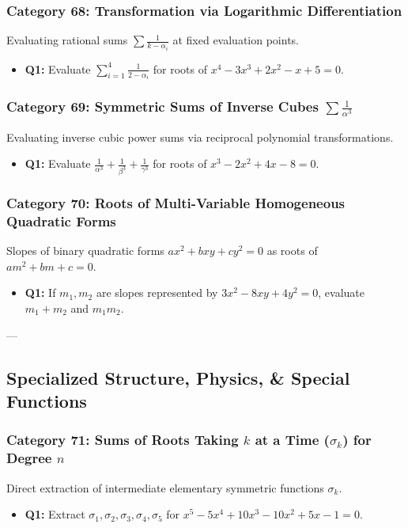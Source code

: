 \documentclass[10pt,a4paper]{article}
\begin{document}
\subsubsection{Category 68: Transformation via Logarithmic Differentiation}
Evaluating rational sums $\sum \frac{1}{k - \alpha_i}$ at fixed evaluation points.
\begin{itemize}[leftmargin=*]
    \item \textbf{Q1:} Evaluate $\sum_{i=1}^4 \frac{1}{2 - \alpha_i}$ for roots of $x^4 - 3x^3 + 2x^2 - x + 5 = 0$.
\end{itemize}

\subsubsection{Category 69: Symmetric Sums of Inverse Cubes $\sum \frac{1}{\alpha^3}$}
Evaluating inverse cubic power sums via reciprocal polynomial transformations.
\begin{itemize}[leftmargin=*]
    \item \textbf{Q1:} Evaluate $\frac{1}{\alpha^3} + \frac{1}{\beta^3} + \frac{1}{\gamma^3}$ for roots of $x^3 - 2x^2 + 4x - 8 = 0$.
\end{itemize}

\subsubsection{Category 70: Roots of Multi-Variable Homogeneous Quadratic Forms}
Slopes of binary quadratic forms $ax^2 + bxy + cy^2 = 0$ as roots of $a m^2 + bm + c = 0$.
\begin{itemize}[leftmargin=*]
    \item \textbf{Q1:} If $m_1, m_2$ are slopes represented by $3x^2 - 8xy + 4y^2 = 0$, evaluate $m_1 + m_2$ and $m_1 m_2$.
\end{itemize}

---

\subsection{Specialized Structure, Physics, \& Special Functions}

\subsubsection{Category 71: Sums of Roots Taking $k$ at a Time ($\sigma_k$) for Degree $n$}
Direct extraction of intermediate elementary symmetric functions $\sigma_k$.
\begin{itemize}[leftmargin=*]
    \item \textbf{Q1:} Extract $\sigma_1, \sigma_2, \sigma_3, \sigma_4, \sigma_5$ for $x^5 - 5x^4 + 10x^3 - 10x^2 + 5x - 1 = 0$.
\end{itemize}
\end{document}
